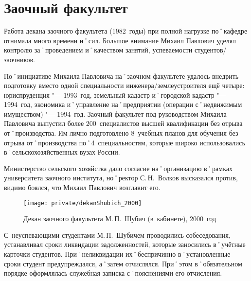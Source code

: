 \section*{Заочный факультет}
\label{sec:correspondenceFaculty}

Работа декана заочного факультета (1982~годы) при полной нагрузке по˚кафедре отнимала много времени и˚сил. Большое внимание Михаил Павлович уделял контролю за˚проведением и˚качеством занятий, успеваемости студентов\-/заочников.

По˚инициативе Михаила Павловича на˚заочном факультете удалось внедрить подготовку вместо одной специальности инженера\-/землеустроителя ещё четыре: юриспруденция "--- 1993~год, земельный кадастр и˚городской кадастр "--- 1994~год, экономика и˚управление на˚предприятии (операции с˚недвижимым имуществом) "--- 1994~год. Заочный факультет под руководством Михаила Павловича выпустил более 200~специалистов высшей квалификации без отрыва от˚производства. Им лично подготовлено 8~учебных планов для обучения без отрыва от˚производства по˚4~специальностям, которые широко использовались в˚сельскохозяйственных вузах России. 

Министерство сельского хозяйства дало согласие на˚организацию в˚рамках университета заочного института, но˚ректор С.\,Н.~Волков высказался против, видимо боялся, что Михаил Павлович возглавит его.

\begin{figure}[h]
\texttt{[image: private/dekanShubich\_2000]}
\caption[Декан заочного факультета М.\,П.~Шубич (в~кабинете), 2000~год]{Декан заочного факультета М.\,П.~Шубич (в~кабинете), 2000~год\footnotemark}
\label{fig:dekanShubich_2000}
\end{figure}

С~неуспевающими студентами М.\,П.~Шубичем проводились собеседования, устанавливал сроки ликвидации задолженностей, которые заносились в˚учётные карточки студентов. При˚неликвидации их˚беспричинно в˚установленные сроки студент предупреждался, а˚затем отчислялся. При˚этом в˚обязательном порядке оформлялась служебная записка с˚пояснениями его отчисления.

